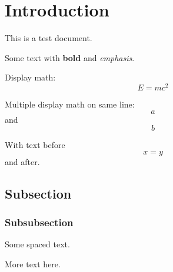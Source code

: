 \documentclass{article}
\begin{document}
\section{Introduction}
This is a test document.

Some text with \textbf{bold} and \emph{emphasis}.

Display math: \[
E = mc^2
\]

Multiple display math on same line: \[a\] and \[b\]

With text before \[x = y\] and after.

\subsection{Subsection}
\subsubsection{Subsubsection}

\vspace{10pt}
Some spaced text.

\medskip
\smallskip
\bigskip
More text here.
\end{document}
